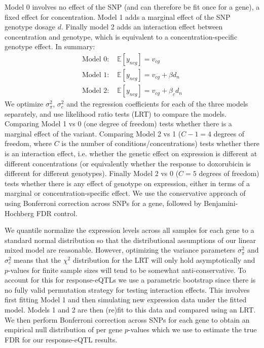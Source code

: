 \documentclass{article}
\begin{document}
Model 0 involves no effect of the SNP (and can therefore be fit once for a gene), a fixed effect for concentration. Model 1 adds a marginal effect of the SNP genotype dosage $d$. Finally model 2 adds an interaction effect between concentration and genotype, which is equivalent to a concentration-specific genotype effect. In summary: 
\begin{align}
\text{Model 0: }& \mathbb{E}[ y_{ncg} ] = v_{cg} \\ 
\text{Model 1: }& \mathbb{E}[ y_{ncg} ] = v_{cg} + \beta d_n \\
\text{Model 2: }& \mathbb{E}[ y_{ncg} ] = v_{cg} + \beta_c d_n \label{eq:betac}
\end{align}
We optimize $\sigma^2_\pi$, $\sigma^2_e$ and the regression coefficients for each of the three models separately, and use likelihood ratio tests (LRT) to compare the models. Comparing Model 1 vs 0 (one degree of freedom) tests whether there is a marginal effect of the variant. Comparing Model 2 vs 1 ($C-1=4$ degrees of freedom, where $C$ is the number of conditions/concentrations) tests whether there is an interaction effect, i.e. whether the genetic effect on expression is different at different concentrations (or equivalently whether the response to doxorubicin is different for different genotypes). Finally Model 2 vs 0 ($C=5$ degrees of freedom) tests whether there is any effect of genotype on expression, either in terms of a marginal or concentration-specific effect. We use the conservative approach of using Bonferroni correction across SNPs for a gene, followed by Benjamini-Hochberg FDR control. 

We quantile normalize the expression levels across all samples for each gene to a standard normal distribution so that the distributional assumptions of our linear mixed model are reasonable. However, optimizing the variance parameters $\sigma^2_\pi$ and $\sigma^2_e$ means that the $\chi^2$ distribution for the LRT will only hold asymptotically and $p$-values for finite sample sizes will tend to be somewhat anti-conservative. To account for this for response-eQTLs we use a parametric bootstrap since there is no fully valid permutation strategy for testing interaction effects. This involves first fitting Model 1 and then simulating new expression data under the fitted model. Models 1 and 2 are then (re)fit to this data and compared using an LRT. We then perform Bonferroni correction across SNPs for each gene to obtain an empirical null distribution of per gene $p$-values which we use to estimate the true FDR for our response-eQTL results. 
\end{document}
